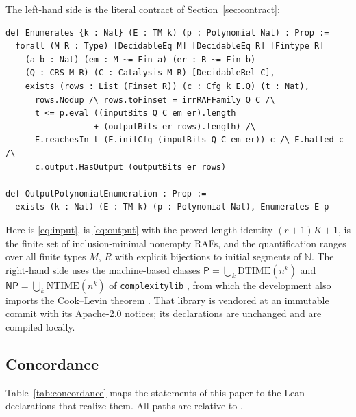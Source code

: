 \documentclass[11pt,a4paper]{article}
\theoremstyle{plain}
\theoremstyle{definition}
\theoremstyle{remark}
\newcommand{\PP}{\mathsf P}
\newcommand{\NP}{\mathsf{NP}}
\newcommand{\Nat}{\mathbb N}
\begin{document}
The left-hand side is the literal contract of Section~\ref{sec:contract}:
\begin{small}\begin{verbatim}
def Enumerates {k : Nat} (E : TM k) (p : Polynomial Nat) : Prop :=
  forall (M R : Type) [DecidableEq M] [DecidableEq R] [Fintype R]
    (a b : Nat) (em : M ~= Fin a) (er : R ~= Fin b)
    (Q : CRS M R) (C : Catalysis M R) [DecidableRel C],
    exists (rows : List (Finset R)) (c : Cfg k E.Q) (t : Nat),
      rows.Nodup /\ rows.toFinset = irrRAFFamily Q C /\
      t <= p.eval ((inputBits Q C em er).length
                  + (outputBits er rows).length) /\
      E.reachesIn t (E.initCfg (inputBits Q C em er)) c /\ E.halted c /\
      c.output.HasOutput (outputBits er rows)

def OutputPolynomialEnumeration : Prop :=
  exists (k : Nat) (E : TM k) (p : Polynomial Nat), Enumerates E p
\end{verbatim}\end{small}
Here \lean{inputBits} is \eqref{eq:input},  is \eqref{eq:output} with the proved length identity $(r+1)K+1$,  is the finite set of inclusion-minimal nonempty RAFs, and the quantification ranges over all finite types $M$, $R$ with explicit bijections to initial segments of $\Nat$. The right-hand side uses the machine-based classes $\PP=\bigcup_k\mathrm{DTIME}(n^k)$ and $\NP=\bigcup_k\mathrm{NTIME}(n^k)$ of \texttt{complexitylib} \cite{schlesinger2025complexitylib}, from which the development also imports the Cook--Levin theorem . That library is vendored at an immutable commit with its Apache-2.0 notices; its declarations are unchanged and are compiled locally.

\subsection{Concordance}

Table~\ref{tab:concordance} maps the statements of this paper to the Lean declarations that realize them. All paths are relative to .
\end{document}
